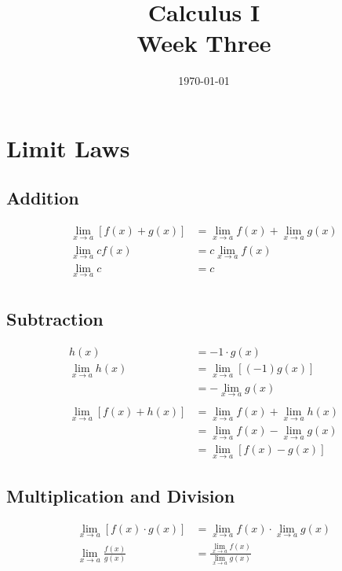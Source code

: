 \documentclass[letterpaper, landscape]{exam}
\author{}
\date{\today}
\title{Calculus I \\ Week Three}
\begin{document}
  \maketitle
  \tableofcontents

  \section{Limit Laws}

  \subsection{Addition}
  \begin{align}
    \lim_{x \to a} \left[ f(x) + g(x) \right] 
    &= \lim_{x \to a} f(x) + \lim_{x \to a} g(x) \label{eq:addition} \\
    \lim_{x \to a} c f(x) &= c \lim_{x \to a} f(x) \label{eq:constant_factor} \\
    \lim_{x \to a} c &= c \\
  \end{align}

  \subsection{Subtraction}
  \begin{align}
    h(x)                & = -1 \cdot g(x) \\
    \lim_{x \to a} h(x) & = \lim_{x \to a} \left[ (-1) g(x) \right] \\
                        & = - \lim_{x \to a} g(x) \\
    \\
    \lim_{x \to a} \left[ f(x) + h(x) \right] 
               & = \lim_{x \to a} f(x) + \lim_{x \to a} h(x) \\
               & = \lim_{x \to a} f(x) - \lim_{x \to a} g(x) \\
               & = \lim_{x \to a} \left[ f(x) - g(x) \right]
  \end{align}

  \subsection{Multiplication and Division}
  \begin{align}
    \lim_{x \to a} \left[ f(x) \cdot g(x) \right] 
      &= \lim_{x \to a} f(x) \cdot \lim_{x \to a} g(x) \\
    \lim_{x \to a} \frac{f(x)}{g(x)} 
      &= \frac{\lim_{x \to a} f(x)}{\lim_{x \to a} g(x)} 
  \end{align}
\end{document}
